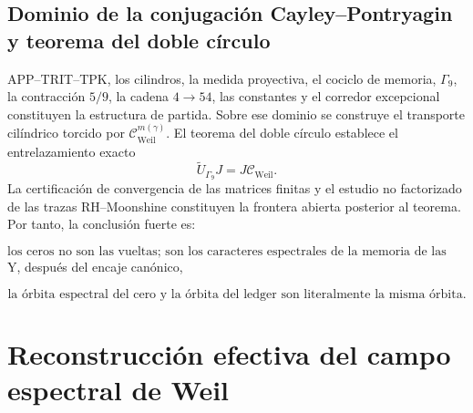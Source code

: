 \subsection{Dominio de la conjugación Cayley–Pontryagin y teorema del doble círculo}
APP–TRIT–TPK, los cilindros, la medida proyectiva, el cociclo de memoria, \(\Gamma_9\), la contracción \(5/9\), la cadena \(4\to54\), las constantes y el corredor excepcional constituyen la estructura de partida. Sobre ese dominio se construye el transporte cilíndrico torcido por \(\mathcal C_{\mathrm{Weil}}^{m(\gamma)}\). El teorema del doble círculo establece el entrelazamiento exacto
  \[
  \widetilde U_{\Gamma_9}J
  =
  J\mathcal C_{\mathrm{Weil}}.
  \]
La certificación de convergencia de las matrices finitas y el estudio no factorizado de las trazas RH–Moonshine constituyen la frontera abierta posterior al teorema.
Por tanto, la conclusión fuerte es:\par
\[
\boxed{
\text{los ceros no son las vueltas;
son los caracteres espectrales de la memoria de las vueltas.}
}
\]
Y, después del encaje canónico,\par
\[
\boxed{
\text{la órbita espectral del cero y la órbita del ledger son literalmente la misma órbita.}
}
\]

\section{Reconstrucción efectiva del campo espectral de Weil}
